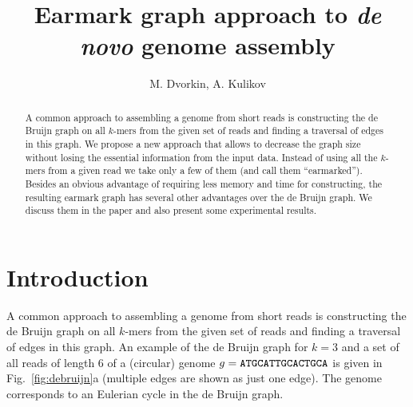\documentclass[12pt]{article}
\begin{document}
\author{M. Dvorkin, A. Kulikov}
\title{Earmark graph approach to {\it de novo} genome assembly}
\maketitle

\begin{abstract}
A common approach to assembling a genome from short reads is constructing
the de Bruijn graph on all $k$-mers from the given set of reads and finding a traversal of edges
in this graph. We propose a new approach that allows to decrease
the graph size without losing the essential information from the input data.
Instead of using all the $k$-mers from a given read we take only a few of them
(and call them ``earmarked''). Besides an obvious advantage of requiring less memory 
and time for constructing, the resulting earmark graph has several other advantages over the
de Bruijn graph. We discuss them in the paper and also present some experimental results.
\end{abstract}

\tableofcontents


\section{Introduction}
A common approach to assembling a genome from short reads is constructing
the de Bruijn graph \cite{PW01} on all $k$-mers from the given set of 
reads and finding a traversal of edges in this graph.{}
An example of the de Bruijn graph for $k=3$ and a set of all reads of length $6$
of a (circular) genome $g={\tt ATGCATTGCACTGCA}$ is given in Fig.~\ref{fig:debruijn}a
(multiple edges are shown as just one edge). The genome corresponds to an Eulerian
cycle in the de Bruijn graph.
\end{document}
